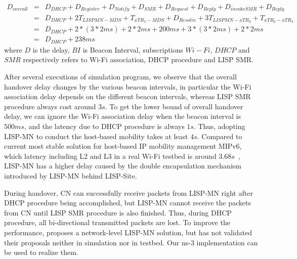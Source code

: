 \begin{eqnarray}
	D_{overall} &=& D_{DHCP} + D_{Register} + D_{Notify} + D_{SMR} + D_{Request} + D_{Reply} + D_{invokeSMR} + D_{Reply} \nonumber \\
	&=& D_{DHCP} + 2T_{LISPMN-MDS} + T_{xTR_3-MDS} + D_{Resolve} + 3T_{LISPMN-xTR_3} + T_{xTR_2-xTR_3} \nonumber \\
	&=& D_{DHCP} + 2* (3*2ms) + 2*2ms + 200ms + 3*(3*2ms) + 2*2ms \nonumber \\
	&=& D_{DHCP} + 238 ms
\end{eqnarray}
where $D$ is the delay, $BI$ is Beacon Interval, subscriptions $Wi-Fi$, $DHCP$ and $SMR$ respectively refers to Wi-Fi association, DHCP procedure and LISP SMR. 

After several executions of simulation program, we observe that the overall handover delay changes by the various beacon intervals, in particular the Wi-Fi association delay depends on the different beacon intervals, whereas LISP SMR procedure always cost around $3s$. To get the lower bound of overall handover delay, we can ignore the Wi-Fi association delay when the beacon interval is $500ms$, and the latency due to DHCP procedure is always $1s$. Thus, adopting LISP-MN to conduct the host-based mobility takes at least $4s$. Compared to current most stable solution for host-based IP mobility management MIPv6, which latency including L2 and L3 in a real Wi-Fi testbed is around $3.68s$~\cite{vassiliou2010analysis}, LISP-MN has a higher delay caused by the double encapsulation mechanism introduced by LISP-MN behind LISP-Site. 

During handover, CN can successfully receive packets from LISP-MN right after DHCP procedure being accomplished, but LISP-MN cannot receive the packets from CN until LISP SMR procedure is also finished. Thus, during DHCP procedure, all bi-directional transmitted packets are lost. To improve the performance, \cite{tang2017lisp} proposes a network-level LISP-MN solution, but has not validated their proposals neither in simulation nor in testbed. Our ns-3 implementation can be used to realize them.


